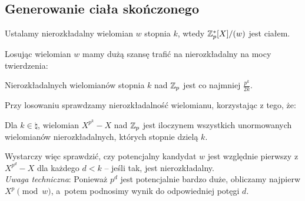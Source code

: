 \subsection{Generowanie ciała skończonego}
Ustalamy nierozkładalny wielomian \( w \) stopnia \( k \), wtedy \( \mathbb{Z}_p^*[X]/(w) \) jest ciałem.

Losując wielomian \( w \) mamy dużą szansę trafić na nierozkładalny na mocy twierdzenia:
\begin{theorem}
	Nierozkładalnych wielomianów stopnia \( k \) nad \( \mathbb{Z}_p \) jest co najmniej \( \frac{p^k}{2k} \).
\end{theorem}
Przy losowaniu sprawdzamy nierozkładalność wielomianu, korzystając z tego, że:
\begin{theorem}
	Dla \( k \in \natural \), wielomian \( X^{p^k} - X \) nad \( \mathbb{Z}_p \) jest iloczynem wszystkich unormowanych wielomianów nierozkładalnych, których stopnie dzielą \( k \).
\end{theorem}
Wystarczy więc sprawdzić, czy potencjalny kandydat \( w \) jest względnie pierwszy z \( X^{p^d} - X \) dla każdego \( d < k \) -- jeśli tak, jest nierozkładalny. \\
\textit{Uwaga techniczna}: Ponieważ \( p^d \) jest potencjalnie bardzo duże, obliczamy najpierw \( X^p \pmod{w} \), a~potem podnosimy wynik do odpowiedniej potęgi \( d \).
